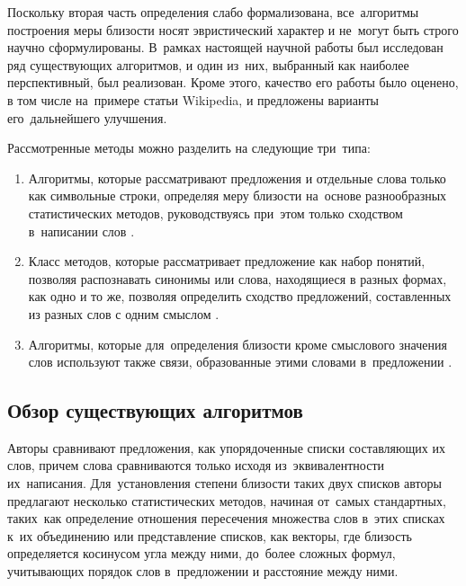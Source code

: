 Поскольку вторая часть определения слабо формализована, 
все~алгоритмы построения меры близости носят эвристический характер и не~могут быть строго научно сформулированы.
В~рамках настоящей научной работы был исследован ряд существующих алгоритмов,
и один из~них, выбранный как наиболее перспективный, был реализован.
Кроме этого, качество его работы было оценено, в том числе на~примере статьи Wikipedia, 
и предложены варианты его~дальнейшего улучшения.

Рассмотренные методы можно разделить на следующие три~типа:

\begin{enumerate}

\item{
Алгоритмы, которые рассматривают предложения и отдельные слова только как символьные строки, 
определяя меру близости на~основе разнообразных статистических методов, 
руководствуясь при~этом только сходством в~написании слов \cite{statisticalSim}.
}

\item {
Класс методов, которые  рассматривает предложение как набор понятий, позволяя распознавать синонимы 
или слова, находящиеся в разных формах, как одно и то же, позволяя определить сходство предложений, 
составленных из разных слов с одним смыслом \cite{wordnetSim}.
}

\item {
Алгоритмы, которые  для~определения близости  кроме смыслового значения слов
используют также связи, образованные этими словами в~предложении \cite{weightedDep, complexSim}.}

\end{enumerate}

\subsection{Обзор существующих алгоритмов}

Авторы \cite{statisticalSim} сравнивают предложения, 
как упорядоченные списки составляющих их слов, 
причем слова сравниваются только исходя из~эквивалентности их~написания. 
Для~установления степени близости таких двух списков авторы предлагают несколько статистических методов,
начиная от~самых стандартных, таких~как определение отношения пересечения множества слов в~этих списках к~их объединению
или представление списков, как векторы, где близость определяется косинусом угла между ними,
до~более сложных формул, учитывающих порядок слов в~предложении и расстояние между ними.

